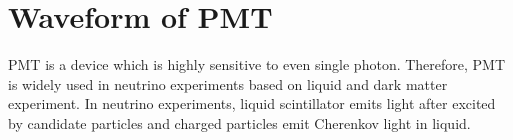 \section{Waveform of PMT} %
PMT is a device which is highly sensitive to even single photon. Therefore, PMT is widely used in neutrino experiments based on liquid and dark matter experiment. In neutrino experiments, liquid scintillator emits light after excited by candidate particles and charged particles emit Cherenkov light in liquid. 
